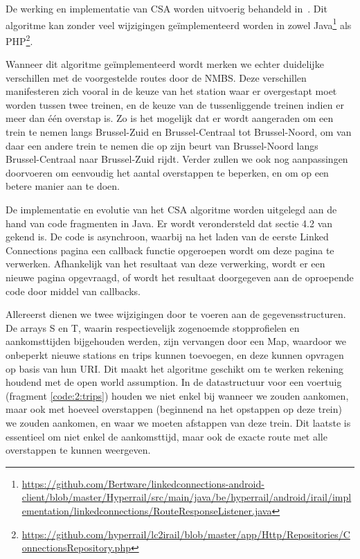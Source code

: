 De werking en implementatie van CSA worden uitvoerig behandeld in~\citep{strasser17}. Dit algoritme kan zonder veel wijzigingen geïmplementeerd worden in zowel Java\footnote{\url{https://github.com/Bertware/linkedconnections-android-client/blob/master/Hyperrail/src/main/java/be/hyperrail/android/irail/implementation/linkedconnections/RouteResponseListener.java}} als PHP\footnote{\url{https://github.com/hyperrail/lc2irail/blob/master/app/Http/Repositories/ConnectionsRepository.php}}.

Wanneer dit algoritme geïmplementeerd wordt merken we echter duidelijke verschillen met de voorgestelde routes door de NMBS. Deze verschillen manifesteren zich vooral in de keuze van het station waar er overgestapt moet worden tussen twee treinen, en de keuze van de tussenliggende treinen indien er meer dan één overstap is. Zo is het mogelijk dat er wordt aangeraden om een trein te nemen langs Brussel-Zuid en Brussel-Centraal tot Brussel-Noord, om van daar een andere trein te nemen die op zijn beurt van Brussel-Noord langs Brussel-Centraal naar Brussel-Zuid rijdt.
Verder zullen we ook nog aanpassingen doorvoeren om eenvoudig het aantal overstappen te beperken, en om op een betere manier aan  te doen.

De implementatie en evolutie van het CSA algoritme worden uitgelegd aan de hand van code fragmenten in Java. Er wordt verondersteld dat sectie 4.2 van \cite{strasser17} gekend is. De code is asynchroon, waarbij na het laden van de eerste Linked Connections pagina een callback functie opgeroepen wordt om deze pagina te verwerken. Afhankelijk van het resultaat van deze verwerking, wordt er een nieuwe pagina opgevraagd, of wordt het resultaat doorgegeven aan de oproepende code door middel van callbacks.

Allereerst dienen we twee wijzigingen door te voeren aan de gegevensstructuren. De arrays S en T, waarin respectievelijk zogenoemde stopprofielen en aankomsttijden bijgehouden werden, zijn vervangen door een Map, waardoor we onbeperkt nieuwe stations en trips kunnen toevoegen, en deze kunnen opvragen op basis van hun URI. Dit maakt het algoritme geschikt om te werken rekening houdend met de open world assumption. In de datastructuur voor een voertuig (fragment \ref{code:2:trips}) houden we niet enkel bij wanneer we zouden aankomen, maar ook met hoeveel overstappen (beginnend na het opstappen op deze trein) we zouden aankomen, en waar we moeten afstappen van deze trein. Dit laatste is essentieel om niet enkel de aankomsttijd, maar ook de exacte route met alle overstappen te kunnen weergeven. 

